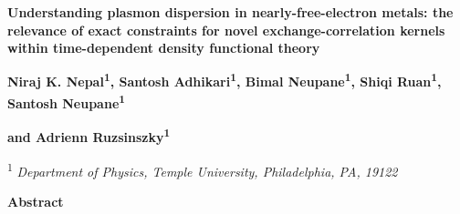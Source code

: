 \documentclass[12pt]{article}
\renewcommand{\_}{\kern-1.5pt\textunderscore\kern-1.5pt}
\begin{document}
\begin{Center}
\textbf{Understanding plasmon dispersion in nearly-free-electron metals: the relevance of exact constraints for novel exchange-correlation kernels within time-dependent density functional theory}
\end{Center}\par

\begin{Center}
\textbf{Niraj K. Nepal\textsuperscript{1},\textsuperscript{ }Santosh Adhikari\textsuperscript{1}, Bimal Neupane\textsuperscript{1}, Shiqi Ruan\textsuperscript{1}, Santosh Neupane\textsuperscript{1 }}
\end{Center}\par

\begin{Center}
\textbf{and Adrienn Ruzsinszky\textsuperscript{1}}
\end{Center}\par

\setlength{\parskip}{0.0pt}
\begin{Center}
\textsuperscript{1}\textit{ Department of Physics, Temple University, Philadelphia, PA, 19122}
\end{Center}\par


\vspace{\baselineskip}
\setlength{\parskip}{9.96pt}
\setlength{\parskip}{0.0pt}
\begin{Center}
\textbf{Abstract}
\end{Center}\par
\end{document}
